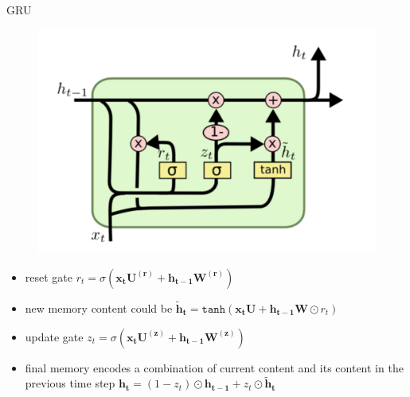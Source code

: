 \begin{frame}{GRU}
    \centering
    \begin{figure}
        \centering
        \includegraphics[scale=0.2]{./figure/gru.png}
    \end{figure}
    \begin{itemize}
        \item reset gate $r_t = \sigma ( \bm{x_t} \bm{U^{(r)}} + \bm{h_{t-1}} \bm{W^{(r)}} )$
        \item new memory content could be $\bm{\tilde{h}_t} = \texttt{tanh} ( \bm{x_t} \bm{U} + \bm{h_{t-1}} \bm{W} 
        \odot r_t)$ 
        \item update gate $z_t = \sigma ( \bm{x_t} \bm{U^{(z)}} + \bm{h_{t-1}} \bm{W^{(z)}} )$
        \item final memory encodes a combination of current content and its content in the previous time step
         $\bm{h_t} = (1-z_t) \odot \bm{h_{t-1}} + z_t \odot \bm{\tilde{h}_t}$
    \end{itemize}
\end{frame}
